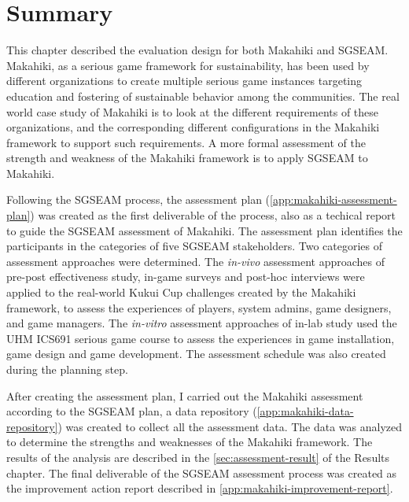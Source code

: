 \section{Summary}

This chapter described the evaluation design for both Makahiki and SGSEAM.  Makahiki, as a serious game framework for sustainability, has been used by different organizations to create multiple serious game instances targeting education and fostering of sustainable behavior among the communities. The real world case study of Makahiki is to look at the different requirements of these organizations, and the corresponding different configurations in the Makahiki framework to support such requirements. A more formal assessment of the strength and weakness of the Makahiki framework is to apply SGSEAM to Makahiki.

Following the SGSEAM process, the assessment plan (\autoref{app:makahiki-assessment-plan}) was created as the first deliverable of the process, also as a techical report \cite{csdl2-13-11} to guide the SGSEAM assessment of Makahiki. The assessment plan identifies the participants in the categories of five SGSEAM stakeholders. Two categories of assessment approaches were determined. The {\em in-vivo} assessment approaches of pre-post effectiveness study, in-game surveys and post-hoc interviews were applied to the real-world Kukui Cup challenges created by the Makahiki framework, to assess the experiences of players, system admins, game designers, and game managers. The {\em in-vitro} assessment approaches of in-lab study used the UHM ICS691 serious game course to assess the experiences in game installation, game design and game development. The assessment schedule was also created during the planning step.

After creating the assessment plan, I carried out the Makahiki assessment according to the SGSEAM plan, a data repository (\autoref{app:makahiki-data-repository}) was created to collect all the assessment data. The data was analyzed to determine the strengths and weaknesses of the Makahiki framework. The results of the analysis are described in the \autoref{sec:assessment-result} of the Results chapter. The final deliverable of the SGSEAM assessment process was created as the improvement action report described in \autoref{app:makahiki-improvement-report}.
